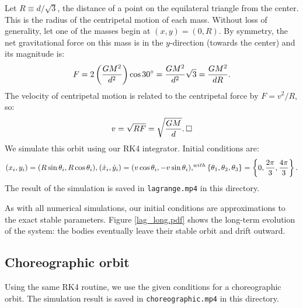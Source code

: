 \documentclass{article}
\begin{document}
Let $R \equiv d / \sqrt{3}$, the distance of a point on the equilateral
triangle from the center. This is the radius of the centripetal motion of
each mass. Without loss of generality, let one of the masses begin at
$(x, y) = (0, R)$. By symmetry, the net gravitational force on this mass
is in the $y$-direction (towards the center) and its magnitude is:
\begin{align}
    F = 2 \left(G M^2 \over d^2\right)\cos 30^\circ = 
    {GM^2 \over d^2} \sqrt 3 = {GM^2 \over dR}.
\end{align}
The velocity of centripetal motion is related to the centripetal force by
$F = v^2 / R$, so:
\begin{align}
    v = \sqrt{RF} = \sqrt{GM \over d}.\,\square
\end{align}
We simulate this orbit using our RK4 integrator. Initial conditions are:
\begin{align}
    (x_i, y_i) = (R\sin\theta_i, R\cos\theta_i),
    \sp{} (\dot x_i, \dot y_i) = (v\cos\theta_i, -v\sin\theta_i),
    \sp{with} \{\theta_1, \theta_2, \theta_3\} =
    \left\{0, {2\pi \over 3}, {4\pi \over 3} \right\}.
\end{align}
The result of the simulation is saved in \texttt{lagrange.mp4} in this
directory.

As with all numerical simulations, our initial conditions are approximations
to the exact stable parameters. Figure \ref{lag_long.pdf} shows the
long-term evolution of the system: the bodies eventually leave their
stable orbit and drift outward.


\subsection{Choreographic orbit}

Using the same RK4 routine, we use the given conditions for a
choreographic orbit. The simulation result is saved in
\texttt{choreographic.mp4} in this directory.
\end{document}
